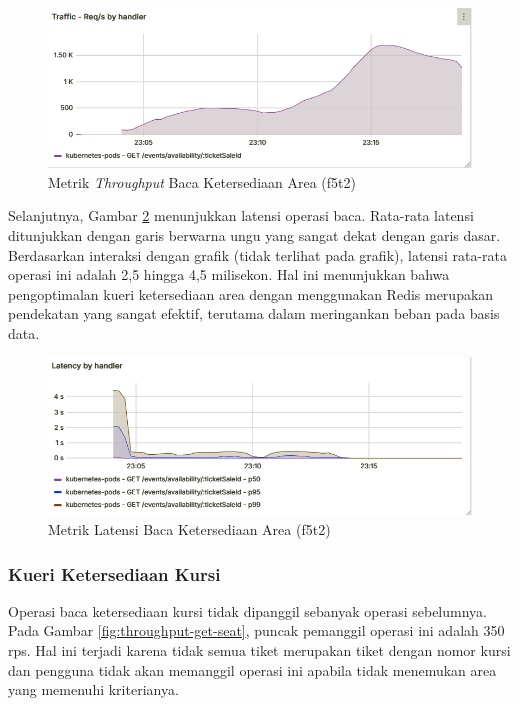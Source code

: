 \begin{figure}[H]
    \centering
    \includegraphics[width=1\textwidth]{resources/chapter-4/throughput-area-availability.png}
    \caption{Metrik \textit{Throughput} Baca Ketersediaan Area (f5t2)}
    \label{fig:throughput-get-area}
\end{figure}

Selanjutnya, Gambar \ref{fig:latency-get-area} menunjukkan latensi operasi baca. Rata-rata latensi ditunjukkan dengan garis berwarna ungu yang sangat dekat dengan garis dasar. Berdasarkan interaksi dengan grafik (tidak terlihat pada grafik), latensi rata-rata operasi ini adalah 2,5 hingga 4,5 milisekon. Hal ini menunjukkan bahwa pengoptimalan kueri ketersediaan area dengan menggunakan Redis merupakan pendekatan yang sangat efektif, terutama dalam meringankan beban pada basis data.

\begin{figure}[H]
    \centering
    \includegraphics[width=1\textwidth]{resources/chapter-4/latency-area-availability.png}
    \caption{Metrik Latensi Baca Ketersediaan Area (f5t2)}
    \label{fig:latency-get-area}
\end{figure}

\subsubsection{Kueri Ketersediaan Kursi}

Operasi baca ketersediaan kursi tidak dipanggil sebanyak operasi sebelumnya. Pada Gambar \ref{fig:throughput-get-seat}, puncak pemanggil operasi ini adalah 350 rps. Hal ini terjadi karena tidak semua tiket merupakan tiket dengan nomor kursi dan pengguna tidak akan memanggil operasi ini apabila tidak menemukan area yang memenuhi kriterianya.

